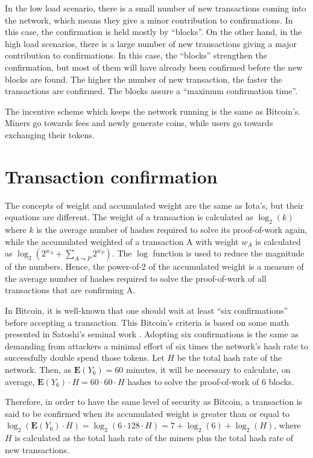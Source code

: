 In the low load scenario, there is a small number of new transactions coming into the network, which means they give a minor contribution to confirmations. In this case, the confirmation is held mostly by ``blocks''. On the other hand, in the high load scenarios, there is a large number of new transactions giving a major contribution to confirmations. In this case, the ``blocks'' strengthen the confirmation, but most of them will have already been confirmed before the new blocks are found. The higher the number of new transaction, the faster the transactions are confirmed. The blocks assure a ``maximum confirmation time''.

The incentive scheme which keeps the network running is the same as Bitcoin's. Miners go towards fees and newly generate coins, while users go towards exchanging their tokens.

\section{Transaction confirmation}

The concepts of weight and accumulated weight are the same as Iota's, but their equations are different. The weight of a transaction is calculated as $\log_2(k)$ where $k$ is the average number of hashes required to solve its proof-of-work again, while the accumulated weighted of a transaction A with weight $w_A$ is calculated as $\log_2(2^{w_A} + \sum_{A \leadsto P} 2^{w_P})$. The $\log$ function is used to reduce the magnitude of the numbers. Hence, the power-of-2 of the accumulated weight is a measure of the average number of hashes required to solve the proof-of-work of all transactions that are confirming A.

In Bitcoin, it is well-known that one should wait at least ``six confirmations'' before accepting a transaction. This Bitcoin's criteria is based on some math presented in Satoshi's seminal work \citep{nakamoto2008bitcoin}. Adopting six confirmations is the same as demanding from attackers a minimal effort of six times the network's hash rate to successfully double spend those tokens. Let $H$ be the total hash rate of the network. Then, as $\mathbf{E}(Y_6) = 60 \text{ minutes}$, it will be necessary to calculate, on average, $\mathbf{E}(Y_6) \cdot H = 60 \cdot 60 \cdot H$ hashes to solve the proof-of-work of 6 blocks.

Therefore, in order to have the same level of security as Bitcoin, a transaction is said to be confirmed when its accumulated weight is greater than or equal to $\log_2(\mathbf{E}(Y_6) \cdot H) = \log_2(6 \cdot 128 \cdot H) = 7 + \log_2(6) + \log_2(H)$, where $H$ is calculated as the total hash rate of the miners plus the total hash rate of new transactions.



